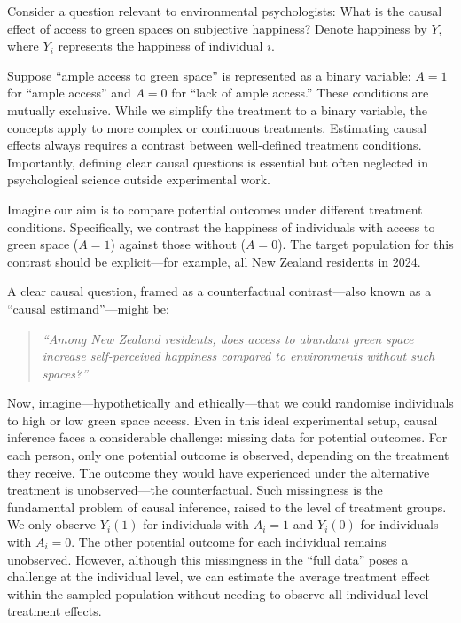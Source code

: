 \documentclass[
  singlecolumn]{article}
\begin{document}
Consider a question relevant to environmental psychologists: What is the
causal effect of access to green spaces on subjective happiness? Denote
happiness by \(Y\), where \(Y_i\) represents the happiness of individual
\(i\).

Suppose ``ample access to green space'' is represented as a binary
variable: \(A = 1\) for ``ample access'' and \(A = 0\) for ``lack of
ample access.'' These conditions are mutually exclusive. While we
simplify the treatment to a binary variable, the concepts apply to more
complex or continuous treatments. Estimating causal effects always
requires a contrast between well-defined treatment conditions.
Importantly, defining clear causal questions is essential but often
neglected in psychological science outside experimental work.

Imagine our aim is to compare potential outcomes under different
treatment conditions. Specifically, we contrast the happiness of
individuals with access to green space (\(A = 1\)) against those without
(\(A = 0\)). The target population for this contrast should be
explicit---for example, all New Zealand residents in 2024.

A clear causal question, framed as a counterfactual contrast---also
known as a ``causal estimand''---might be:

\begin{quote}
\emph{``Among New Zealand residents, does access to abundant green space
increase self-perceived happiness compared to environments without such
spaces?''}
\end{quote}

Now, imagine---hypothetically and ethically---that we could randomise
individuals to high or low green space access. Even in this ideal
experimental setup, causal inference faces a considerable challenge:
missing data for potential outcomes. For each person, only one potential
outcome is observed, depending on the treatment they receive. The
outcome they would have experienced under the alternative treatment is
unobserved---the counterfactual. Such missingness is the fundamental
problem of causal inference, raised to the level of treatment groups. We
only observe \(Y_i(1)\) for individuals with \(A_i = 1\) and \(Y_i(0)\)
for individuals with \(A_i = 0\). The other potential outcome for each
individual remains unobserved. However, although this missingness in the
``full data'' poses a challenge at the individual level, we can estimate
the average treatment effect within the sampled population without
needing to observe all individual-level treatment effects.
\end{document}
